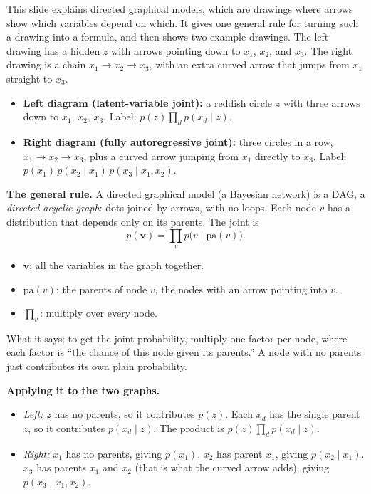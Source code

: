 This slide explains directed graphical models, which are drawings where arrows show which variables depend on which. It gives one general rule for turning such a drawing into a formula, and then shows two example drawings. The left drawing has a hidden $z$ with arrows pointing down to $x_1$, $x_2$, and $x_3$. The right drawing is a chain $x_1\to x_2\to x_3$, with an extra curved arrow that jumps from $x_1$ straight to $x_3$.
\begin{itemize}
\item \textbf{Left diagram (latent-variable joint):} a reddish circle $z$ with three arrows down to $x_1$, $x_2$, $x_3$. Label: $p(z)\prod_d p(x_d\mid z)$.
\item \textbf{Right diagram (fully autoregressive joint):} three circles in a row, $x_1\to x_2\to x_3$, plus a curved arrow jumping from $x_1$ directly to $x_3$. Label: $p(x_1)\,p(x_2\mid x_1)\,p(x_3\mid x_1,x_2)$.
\end{itemize}

\textbf{The general rule.} A directed graphical model (a Bayesian network) is a DAG, a \textit{directed acyclic graph}: dots joined by arrows, with no loops. Each node $v$ has a distribution that depends only on its parents. The joint is
\[
p(\mathbf{v})=\prod_{v}p\big(v\mid\mathrm{pa}(v)\big).
\]
\begin{itemize}
\item $\mathbf{v}$: all the variables in the graph together.
\item $\mathrm{pa}(v)$: the parents of node $v$, the nodes with an arrow pointing into $v$.
\item $\prod_v$: multiply over every node.
\end{itemize}
What it says: to get the joint probability, multiply one factor per node, where each factor is ``the chance of this node given its parents.'' A node with no parents just contributes its own plain probability.

\textbf{Applying it to the two graphs.}
\begin{itemize}
\item \textit{Left:} $z$ has no parents, so it contributes $p(z)$. Each $x_d$ has the single parent $z$, so it contributes $p(x_d\mid z)$. The product is $p(z)\prod_d p(x_d\mid z)$.
\item \textit{Right:} $x_1$ has no parents, giving $p(x_1)$. $x_2$ has parent $x_1$, giving $p(x_2\mid x_1)$. $x_3$ has parents $x_1$ and $x_2$ (that is what the curved arrow adds), giving $p(x_3\mid x_1,x_2)$.
\end{itemize}

